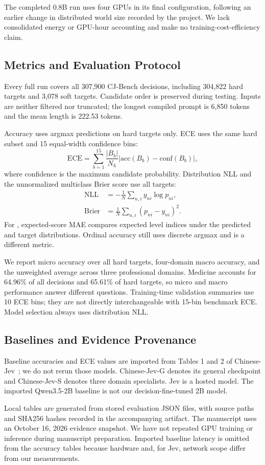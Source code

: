 The completed 0.8B run uses four GPUs in its final configuration, following an earlier change in distributed world size recorded by the project. We lack consolidated energy or GPU-hour accounting and make no training-cost-efficiency claim.

\subsection{Metrics and Evaluation Protocol}
Every full run covers all 307,900 CJ-Bench decisions, including 304,822 hard targets and 3,078 soft targets. Candidate order is preserved during testing. Inputs are neither filtered nor truncated; the longest compiled prompt is 6,850 tokens and the mean length is 222.53 tokens.

Accuracy uses argmax predictions on hard targets only. ECE uses the same hard subset and 15 equal-width confidence bins:
\begin{equation}
\mathrm{ECE}=\sum_{b=1}^{15}\frac{|B_b|}{N_h}
\left|\mathrm{acc}(B_b)-\mathrm{conf}(B_b)\right|,\label{eq:ece}
\end{equation}
where confidence is the maximum candidate probability. Distribution NLL and the unnormalized multiclass Brier score use all targets:
\begin{align}
\mathrm{NLL}&=-\frac{1}{N}\sum_{n,i}y_{ni}\log p_{ni},\\
\mathrm{Brier}&=\frac{1}{N}\sum_{n,i}(p_{ni}-y_{ni})^2.
\end{align}
For \score{}, expected-score MAE compares expected level indices under the predicted and target distributions. Ordinal accuracy still uses discrete argmax and is a different metric.

We report micro accuracy over all hard targets, four-domain macro accuracy, and the unweighted average across three professional domains. Medicine accounts for 64.96\% of all decisions and 65.61\% of hard targets, so micro and macro performance answer different questions. Training-time validation summaries use 10 ECE bins; they are not directly interchangeable with 15-bin benchmark ECE. Model selection always uses distribution NLL.

\subsection{Baselines and Evidence Provenance}
Baseline accuracies and ECE values are imported from Tables 1 and 2 of Chinese-Jev~\citep{wang2026chinesejev}; we do not rerun those models. Chinese-Jev-G denotes its general checkpoint and Chinese-Jev-S denotes three domain specialists. Jev is a hosted model. The imported Qwen3.5-2B baseline is not our decision-fine-tuned 2B model.

Local tables are generated from stored evaluation JSON files, with source paths and SHA256 hashes recorded in the accompanying artifact. The manuscript uses an October 16, 2026 evidence snapshot. We have not repeated GPU training or inference during manuscript preparation. Imported baseline latency is omitted from the accuracy tables because hardware and, for Jev, network scope differ from our measurements.
